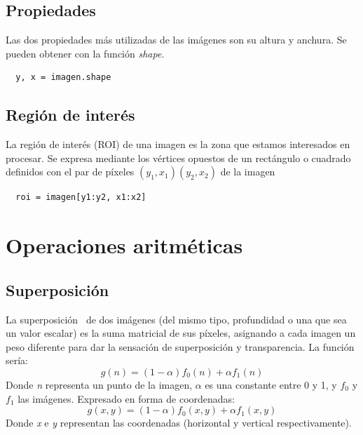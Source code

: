 \subsection{Propiedades}
Las dos propiedades más utilizadas de las imágenes son su altura y
anchura.  Se pueden obtener con la función \emph{shape}.
\begin{verbatim}
  y, x = imagen.shape
\end{verbatim}

\subsection{Región de interés}\label{tecnica:roi}
La región de interés (ROI) de una imagen es la zona que estamos
interesados en procesar. Se expresa mediante los vértices opuestos de
un rectángulo o cuadrado definidos con el par de píxeles
$\left(y_1,x_1\right)\left(y_2,x_2\right)$ de la imagen
\begin{verbatim}
  roi = imagen[y1:y2, x1:x2]
\end{verbatim}

\section{Operaciones aritméticas}
\subsection{Superposición}
La superposición\emph{~\citep[3.1.1 Pixel transforms, 3.1.3
  Compositing and matting]{szeliski2010computer}} de dos imágenes (del
mismo tipo, profundidad o una que sea un valor escalar) es la suma
matricial de sus píxeles, asignando a cada imagen un peso diferente
para dar la sensación de superposición y transparencia. La función
sería:
\begin{equation*}
  g(n) = (1 - \alpha)f_0(n) + \alpha f_1(n)
\end{equation*}
Donde \emph{n} representa un punto de la imagen, \emph{$\alpha$} es
una constante entre 0 y 1, y \emph{$f_0$} y \emph{$f_1$} las imágenes.
Expresado en forma de coordenadas:
\begin{equation*}
  g(x, y) = (1 - \alpha)f_0(x, y) + \alpha f_1(x, y)
\end{equation*}
Donde \emph{x} e \emph{y} representan las coordenadas (horizontal y
vertical respectivamente).


